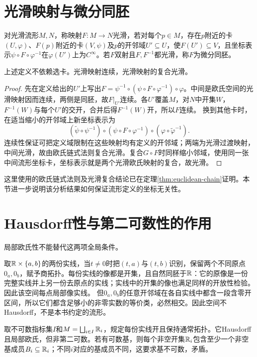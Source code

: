 \section{光滑映射与微分同胚}
\begin{definition}[光滑映射]
对光滑流形$M,N$，称映射$F:M\to N$光滑，若对每个$p\in M$，存在$p$附近的卡$(U,\varphi)$、$F(p)$附近的卡$(V,\psi)$及$p$的开邻域$U'\subseteq U$，使$F(U')\subseteq V$，且坐标表示$\psi\circ F\circ\varphi^{-1}$在$\varphi(U')$上为$C^\infty$。若$F$双射且$F,F^{-1}$都光滑，称$F$为微分同胚。
\end{definition}
\begin{theorem}
上述定义不依赖选卡。光滑映射连续，光滑映射的复合光滑。
\end{theorem}
\begin{proof}
先在定义给出的$U'$上写出$F=\psi^{-1}\circ(\psi\circ F\circ\varphi^{-1})\circ\varphi$。中间是欧氏空间的光滑映射因而连续，两侧是同胚，故$F|_{U'}$连续。各$U'$覆盖$M$，对$N$中开集$W$，$F^{-1}(W)$与每个$U'$的交开，合并后得$F^{-1}(W)$开，所以$F$连续。
换到其他卡时，在适当缩小的开邻域上新坐标表示为
\[
(\widetilde\psi\circ\psi^{-1})\circ
(\psi\circ F\circ\varphi^{-1})\circ
(\varphi\circ\widetilde\varphi^{-1}).
\]
连续性保证可把定义域限制在这些映射均有定义的开邻域；两端为光滑过渡映射，中间光滑，故由欧氏链式法则复合光滑。复合$G\circ F$时同样缩小邻域，使用同一张中间流形坐标卡，坐标表示就是两个光滑欧氏映射的复合，故光滑。
\end{proof}
这里使用的欧氏链式法则及光滑复合结论已在定理\ref{thm:euclidean-chain}证明。本节进一步说明该分析结果如何保证流形定义的坐标无关性。



\section{Hausdorff性与第二可数性的作用}
局部欧氏性不能替代这两项全局条件。
\begin{example}[有两个原点的直线]
取$\mathbb{R}\times\{a,b\}$的两份实线，当$t\ne0$时把$(t,a)$与$(t,b)$识别，保留两个不同原点$0_a,0_b$，赋予商拓扑。每份实线的像都是开集，且自然同胚于$\mathbb{R}$：它的原像是一份完整实线并上另一份去原点的实线；实线中的开集的像也满足同样的开放性检验。因此该空间每点局部像实线。
但$0_a,0_b$的任意开邻域在各自实线中都含一段含零开区间，所以它们都含足够小的非零实数的等价类，必然相交。因此空间不Hausdorff，不是本书约定的流形。
\end{example}
\begin{example}[不可数份实线的不交并]
取不可数指标集$I$和$M=\bigsqcup_{i\in I}\mathbb{R}_i$，规定每份实线开且保持通常拓扑。它Hausdorff且局部欧氏，但非第二可数。若有可数基，则每个非空开集$\mathbb{R}_i$包含至少一个非空基成员$B_i\subseteq\mathbb{R}_i$；不同$i$对应的基成员不同，这要求基不可数，矛盾。
\end{example}



